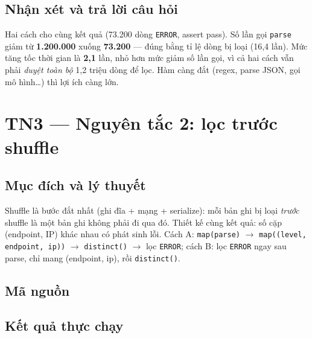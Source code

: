 \documentclass[12pt,a4paper,oneside]{article}
\begin{document}


\subsection{Nhận xét và trả lời câu hỏi}

Hai cách cho cùng kết quả (73.200 dòng \texttt{ERROR}, assert pass). Số lần gọi \texttt{parse} giảm từ \textbf{1.200.000} xuống \textbf{73.200} --- đúng bằng tỉ lệ dòng bị loại (16,4 lần). Mức tăng tốc thời gian là \textbf{2,1} lần, nhỏ hơn mức giảm số lần gọi, vì cả hai cách vẫn phải \emph{duyệt toàn bộ} 1,2 triệu dòng để lọc. Hàm càng đắt (regex, parse JSON, gọi mô hình\ldots) thì lợi ích càng lớn.

\section{TN3 --- Nguyên tắc 2: lọc trước shuffle}
\label{sec:tn3}

\subsection{Mục đích và lý thuyết}

Shuffle là bước đắt nhất (ghi đĩa + mạng + serialize): mỗi bản ghi bị loại \emph{trước} shuffle là một bản ghi không phải đi qua đó. Thiết kế cùng kết quả: số cặp (endpoint, IP) khác nhau có phát sinh lỗi. Cách A: \texttt{map(parse)} $\to$ \texttt{map((level, endpoint, ip))} $\to$ \texttt{distinct()} $\to$ lọc \texttt{ERROR}; cách B: lọc \texttt{ERROR} ngay sau parse, chỉ mang (endpoint, ip), rồi \texttt{distinct()}.

\subsection{Mã nguồn}



\subsection{Kết quả thực chạy}
\end{document}
